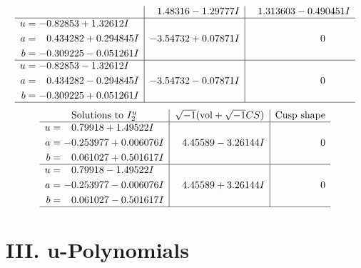 \documentclass[1p]{elsarticle_modified}
\theoremstyle{definition}
\newcommand{\I}{\sqrt{-1}}
\begin{document}
$$\begin{array}{c|c|c}
 & \phantom{-}1.48316 - 1.29777 I & \phantom{-}1.313603 - 0.490451 I \\ \hline\begin{aligned}
u &= -0.82853 + 1.32612 I \\
a &= \phantom{-}0.434282 + 0.294845 I \\
b &= -0.309225 - 0.051261 I\end{aligned}
 & -3.54732 + 0.07871 I & \phantom{-0.000000 } 0 \\ \hline\begin{aligned}
u &= -0.82853 - 1.32612 I \\
a &= \phantom{-}0.434282 - 0.294845 I \\
b &= -0.309225 + 0.051261 I\end{aligned}
 & -3.54732 - 0.07871 I & \phantom{-0.000000 } 0\\
 \hline 
 \end{array}$$\newpage$$\begin{array}{c|c|c}  
\text{Solutions to }I^u_{2}& \I (\text{vol} + \sqrt{-1}CS) & \text{Cusp shape}\\
 \hline 
\begin{aligned}
u &= \phantom{-}0.79918 + 1.49522 I \\
a &= -0.253977 + 0.006076 I \\
b &= \phantom{-}0.061027 + 0.501617 I\end{aligned}
 & \phantom{-}4.45589 - 3.26144 I & \phantom{-0.000000 } 0 \\ \hline\begin{aligned}
u &= \phantom{-}0.79918 - 1.49522 I \\
a &= -0.253977 - 0.006076 I \\
b &= \phantom{-}0.061027 - 0.501617 I\end{aligned}
 & \phantom{-}4.45589 + 3.26144 I & \phantom{-0.000000 } 0\\
 \hline 
 \end{array}$$\newpage
\newpage\renewcommand{\arraystretch}{1}
\centering \section*{ III. u-Polynomials}
\end{document}
